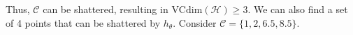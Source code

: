 \documentclass[11pt, a4paper]{article}
\begin{document}
\begin{large}
Thus, $\mathcal{C}$ can be shattered, resulting in $\text{VCdim}(\mathcal{H})\geq3$.
We can also find a set of 4 points that can be shattered by $h_{\theta}$. Consider $\mathcal{C}=\{1,2,6.5,8.5\}$.\newpage


\end{large}
\end{document}
